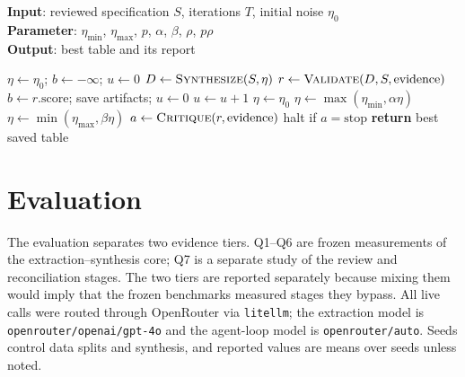\documentclass[letterpaper]{article}
\begin{document}
\begin{algorithm}[t]
\caption{Synthesis--validation--critique loop.}
\label{alg:pivot}
\textbf{Input}: reviewed specification $S$, iterations $T$, initial noise $\eta_0$ \\
\textbf{Parameter}: $\eta_{\min}$, $\eta_{\max}$, $p$, $\alpha$, $\beta$, $\rho$, $p\rho$ \\
\textbf{Output}: best table and its report
\begin{algorithmic}[1]
\STATE $\eta \leftarrow \eta_0$; $b \leftarrow -\infty$; $u \leftarrow 0$
  \STATE $D \leftarrow \textsc{Synthesize}(S, \eta)$
  \STATE $r \leftarrow \textsc{Validate}(D, S, \text{evidence})$
    \STATE $b \leftarrow r.\text{score}$; save artifacts; $u \leftarrow 0$
  \ELSE
    \STATE $u \leftarrow u + 1$
      \STATE $\eta \leftarrow \eta_0$
      \STATE $\eta \leftarrow \max(\eta_{\min}, \alpha\eta)$
    \ELSE
      \STATE $\eta \leftarrow \min(\eta_{\max}, \beta\eta)$
    \ENDIF
  \ENDIF
  \STATE $a \leftarrow \textsc{Critique}(r, \text{evidence})$
  \STATE halt if $a = \text{stop}$
\ENDFOR
\STATE \textbf{return} best saved table
\end{algorithmic}
\end{algorithm}

\section{Evaluation}
\label{sec:questions}

The evaluation separates two evidence tiers. Q1--Q6 are frozen measurements of the
extraction--synthesis core; Q7 is a separate study of the review and reconciliation stages. The
two tiers are reported separately because mixing them would imply that the frozen benchmarks
measured stages they bypass. All live calls were routed through OpenRouter via \texttt{litellm};
the extraction model is \texttt{openrouter/openai/gpt-4o} and the agent-loop model is
\texttt{openrouter/auto}. Seeds control data splits and synthesis, and reported values are means
over seeds unless noted.
\end{document}
